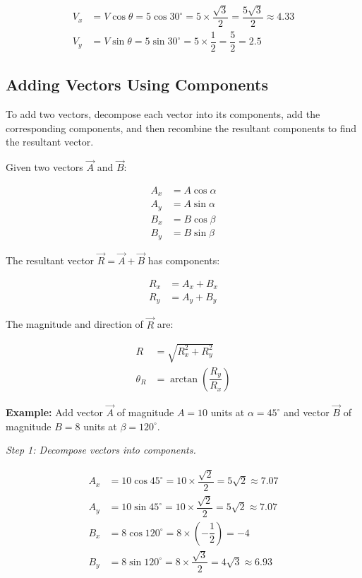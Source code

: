 \documentclass{article}
\begin{document}
\begin{multicols}{2}
\[
\begin{aligned}
V_x &= V \cos \theta = 5 \cos 30^\circ = 5 \times \dfrac{\sqrt{3}}{2} = \dfrac{5\sqrt{3}}{2} \approx 4.33 \\
V_y &= V \sin \theta = 5 \sin 30^\circ = 5 \times \dfrac{1}{2} = \dfrac{5}{2} = 2.5
\end{aligned}
\]

\subsection*{Adding Vectors Using Components}

To add two vectors, decompose each vector into its components, add the corresponding components, and then recombine the resultant components to find the resultant vector.

Given two vectors \(\vec{A}\) and \(\vec{B}\):

\[
\begin{aligned}
A_x &= A \cos \alpha \\
A_y &= A \sin \alpha \\
B_x &= B \cos \beta \\
B_y &= B \sin \beta
\end{aligned}
\]

The resultant vector \(\vec{R} = \vec{A} + \vec{B}\) has components:

\[
\begin{aligned}
R_x &= A_x + B_x \\
R_y &= A_y + B_y
\end{aligned}
\]

The magnitude and direction of \(\vec{R}\) are:

\[
\begin{aligned}
R &= \sqrt{R_x^2 + R_y^2} \\
\theta_R &= \arctan\left( \dfrac{R_y}{R_x} \right)
\end{aligned}
\]

\textbf{Example:} Add vector \(\vec{A}\) of magnitude \( A = 10 \) units at \( \alpha = 45^\circ \) and vector \(\vec{B}\) of magnitude \( B = 8 \) units at \( \beta = 120^\circ \).

\textit{Step 1: Decompose vectors into components.}

\[
\begin{aligned}
A_x &= 10 \cos 45^\circ = 10 \times \dfrac{\sqrt{2}}{2} = 5\sqrt{2} \approx 7.07 \\
A_y &= 10 \sin 45^\circ = 10 \times \dfrac{\sqrt{2}}{2} = 5\sqrt{2} \approx 7.07 \\
B_x &= 8 \cos 120^\circ = 8 \times \left( -\dfrac{1}{2} \right) = -4 \\
B_y &= 8 \sin 120^\circ = 8 \times \dfrac{\sqrt{3}}{2} = 4\sqrt{3} \approx 6.93
\end{aligned}
\]


\end{multicols}
\end{document}
